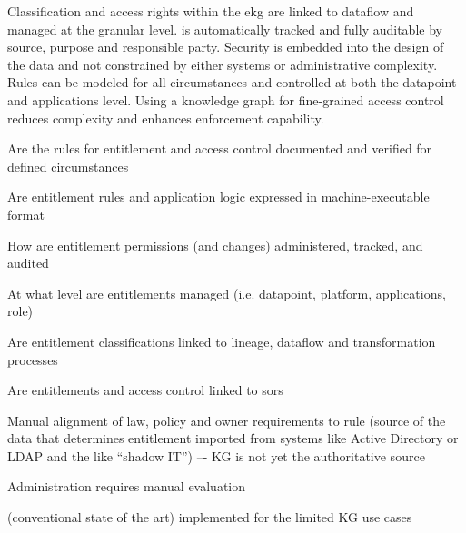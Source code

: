 %
%

\ekgmmContextSection

Classification and access rights within the \gls{ekg} are linked to dataflow and managed at the granular level.
 is automatically tracked and fully auditable by source, purpose and responsible party.
Security is embedded into the design of the data and not constrained by either systems or administrative complexity.
Rules can be modeled for all circumstances and controlled at both the datapoint and applications level.
Using a knowledge graph for fine-grained access control reduces complexity and enhances enforcement capability.

\ekgmmcorequestionssection

\begin{core-questions}

  \item [\thesection.1] Are the rules for entitlement and access control documented and verified for defined circumstances
  \item [\thesection.2] Are entitlement rules and application logic expressed in machine-executable format
  \item [\thesection.3] How are entitlement permissions (and changes) administered, tracked, and audited
  \item [\thesection.4] At what level are entitlements managed (i.e. datapoint, platform, applications, role)
  \item [\thesection.5] Are entitlement classifications linked to lineage, dataflow and transformation processes
  \item [\thesection.6] Are entitlements and access control linked to \glspl{sor}

\end{core-questions}

\ekgmmscoringsection

\ekgmmscoringlevelOne

\begin{scoring}

  \item Manual alignment of law, policy and owner requirements to rule (source of the data that determines entitlement
        imported from systems like Active Directory or LDAP and the like “shadow IT”) –-
        KG is not yet the authoritative source
  \item Administration requires manual evaluation
  \item {} (conventional state of the art) implemented for the limited KG use cases

\end{scoring}


